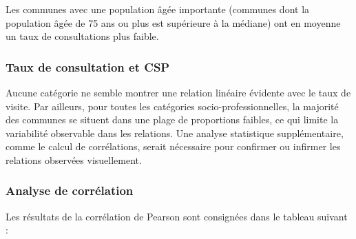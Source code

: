 \documentclass[
]{article}
\begin{document}
Les communes avec une population âgée importante (communes dont la
population âgée de 75 ans ou plus est supérieure à la médiane) ont en
moyenne un taux de consultations plus faible.

\subsubsection{Taux de consultation et
CSP}\label{taux-de-consultation-et-csp}

Aucune catégorie ne semble montrer une relation linéaire évidente avec
le taux de visite. Par ailleurs, pour toutes les catégories
socio-professionnelles, la majorité des communes se situent dans une
plage de proportions faibles, ce qui limite la variabilité observable
dans les relations. Une analyse statistique supplémentaire, comme le
calcul de corrélations, serait nécessaire pour confirmer ou infirmer les
relations observées visuellement.

\subsubsection{Analyse de corrélation}\label{analyse-de-corruxe9lation}

Les résultats de la corrélation de Pearson sont consignées dans le
tableau suivant :
\end{document}

